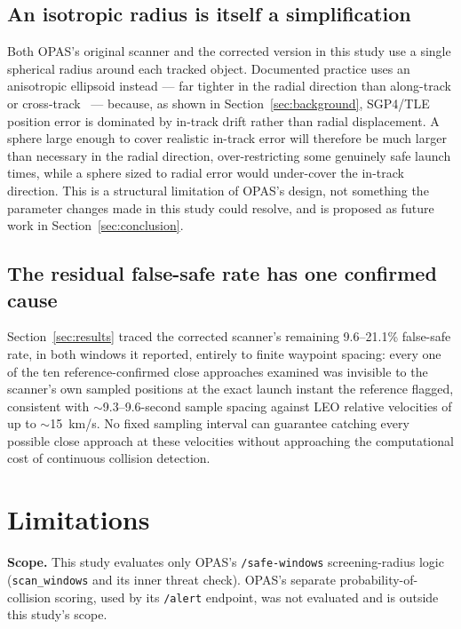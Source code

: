 \documentclass[11pt,a4paper]{article}
\begin{document}
\subsection{An isotropic radius is itself a simplification}

Both OPAS's original scanner and the corrected version in this study use a
single spherical radius around each tracked object. Documented practice uses an anisotropic ellipsoid instead --- far tighter in the radial direction than along-track or cross-track~\cite{nasa_screening,nasa_handbook} --- because,
as shown in Section~\ref{sec:background}, SGP4/TLE position error is
dominated by in-track drift rather than radial displacement. A sphere large
enough to cover realistic in-track error will therefore be much larger than
necessary in the radial direction, over-restricting some genuinely safe
launch times, while a sphere sized to radial error would under-cover the
in-track direction. This is a structural limitation of OPAS's design, not
something the parameter changes made in this study could resolve, and is
proposed as future work in Section~\ref{sec:conclusion}.

\subsection{The residual false-safe rate has one confirmed cause}

Section~\ref{sec:results} traced the corrected scanner's remaining
9.6--21.1\% false-safe rate, in both windows it reported, entirely to finite
waypoint spacing: every one of the ten reference-confirmed close approaches
examined was invisible to the scanner's own sampled positions at the exact
launch instant the reference flagged, consistent with $\sim$9.3--9.6-second
sample spacing against LEO relative velocities of up to $\sim$15~km/s. No
fixed sampling interval can guarantee catching every possible close approach
at these velocities without approaching the computational cost of
continuous collision detection.

\section{Limitations}
\label{sec:limitations}

\textbf{Scope.} This study evaluates only OPAS's \texttt{/safe-windows}
screening-radius logic (\texttt{scan\_windows} and its inner threat check).
OPAS's separate probability-of-collision scoring, used by its
\texttt{/alert} endpoint, was not evaluated and is outside this study's
scope.
\end{document}
